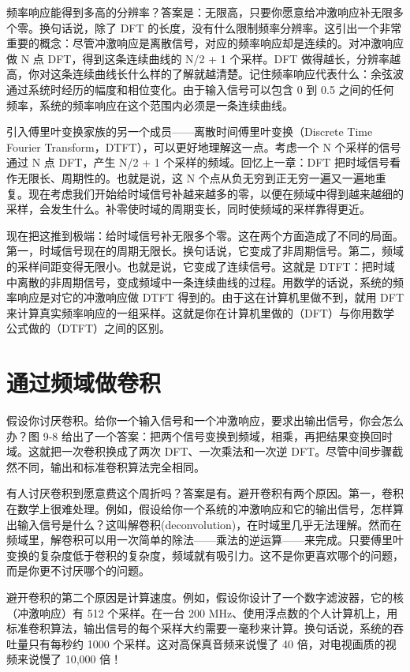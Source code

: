 频率响应能得到多高的分辨率？答案是：无限高，只要你愿意给冲激响应补无限多个零。换句话说，除了
DFT
的长度，没有什么限制频率分辨率。这引出一个非常重要的概念：尽管冲激响应是离散信号，对应的频率响应却是连续的。对冲激响应做
N 点 DFT，得到这条连续曲线的 N/2 + 1 个采样。DFT
做得越长，分辨率越高，你对这条连续曲线长什么样的了解就越清楚。记住频率响应代表什么：余弦波通过系统时经历的幅度和相位变化。由于输入信号可以包含
0 到 0.5 之间的任何频率，系统的频率响应在这个范围内必须是一条连续曲线。

引入傅里叶变换家族的另一个成员------离散时间傅里叶变换（Discrete Time
Fourier Transform，DTFT），可以更好地理解这一点。考虑一个 N
个采样的信号通过 N 点 DFT，产生 N/2 + 1 个采样的频域。回忆上一章：DFT
把时域信号看作无限长、周期性的。也就是说，这 N
个点从负无穷到正无穷一遍又一遍地重复。现在考虑我们开始给时域信号补越来越多的零，以便在频域中得到越来越细的采样，会发生什么。补零使时域的周期变长，同时使频域的采样靠得更近。

现在把这推到极端：给时域信号补无限多个零。这在两个方面造成了不同的局面。第一，时域信号现在的周期无限长。换句话说，它变成了非周期信号。第二，频域的采样间距变得无限小。也就是说，它变成了连续信号。这就是
DTFT：把时域中离散的非周期信号，变成频域中一条连续曲线的过程。用数学的话说，系统的频率响应是对它的冲激响应做
DTFT 得到的。由于这在计算机里做不到，就用 DFT
来计算真实频率响应的一组采样。这就是你在计算机里做的（DFT）与你用数学公式做的（DTFT）之间的区别。

\section{通过频域做卷积}

假设你讨厌卷积。给你一个输入信号和一个冲激响应，要求出输出信号，你会怎么办？图
9-8
给出了一个答案：把两个信号变换到频域，相乘，再把结果变换回时域。这就把一次卷积换成了两次
DFT、一次乘法和一次逆
DFT。尽管中间步骤截然不同，输出和标准卷积算法完全相同。

有人讨厌卷积到愿意费这个周折吗？答案是有。避开卷积有两个原因。第一，卷积在数学上很难处理。例如，假设给你一个系统的冲激响应和它的输出信号，怎样算出输入信号是什么？这叫解卷积(deconvolution)，在时域里几乎无法理解。然而在频域里，解卷积可以用一次简单的除法------乘法的逆运算------来完成。只要傅里叶变换的复杂度低于卷积的复杂度，频域就有吸引力。这不是你更喜欢哪个的问题，而是你更不讨厌哪个的问题。

避开卷积的第二个原因是计算速度。例如，假设你设计了一个数字滤波器，它的核（冲激响应）有
512 个采样。在一台 200
MHz、使用浮点数的个人计算机上，用标准卷积算法，输出信号的每个采样大约需要一毫秒来计算。换句话说，系统的吞吐量只有每秒约
1000 个采样。这对高保真音频来说慢了 40 倍，对电视画质的视频来说慢了
10,000 倍！

